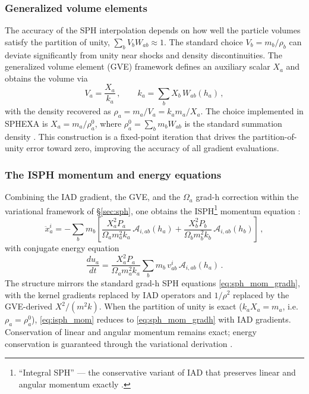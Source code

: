 \subsubsection*{Generalized volume elements}

The accuracy of the SPH interpolation depends on how well the particle volumes satisfy the partition of unity, $\sum_b V_b W_{ab} \approx 1$. The standard choice $V_b = m_b / \rho_b$ can deviate significantly from unity near shocks and density discontinuities. The generalized volume element (GVE) framework \cite{Cabezon2017, Cabezon2022} defines an auxiliary scalar $X_a$ and obtains the volume via
\begin{equation}
    V_a = \frac{X_a}{k_a}\,, \qquad k_a = \sum_b X_b \, W_{ab}(h_a)\,,
    \label{eq:gve}
\end{equation}
with the density recovered as $\rho_a = m_a / V_a = k_a m_a / X_a$. The choice implemented in SPHEXA is $X_a = m_a / \rho_a^0$, where $\rho_a^0 = \sum_b m_b W_{ab}$ is the standard summation density \cite{Cabezon2022}. This construction is a fixed-point iteration that drives the partition-of-unity error toward zero, improving the accuracy of all gradient evaluations.


\subsubsection*{The ISPH momentum and energy equations}

Combining the IAD gradient, the GVE, and the $\Omega_a$ grad-h correction within the variational framework of \S\ref{sec:sph}, one obtains the ISPH\footnote{``Integral SPH'' --- the conservative variant of IAD that preserves linear and angular momentum exactly \cite{Cabezon2022}.} momentum equation \cite{Cabezon2022}:
\begin{equation}
    \ddot{x}^i_a = -\sum_b m_b \left[\frac{X_a^2 P_a}{\Omega_a m_a^2 k_a} \, \mathcal{A}_{i,ab}(h_a) + \frac{X_b^2 P_b}{\Omega_b m_b^2 k_b} \, \mathcal{A}_{i,ab}(h_b) \right]\,,
    \label{eq:isph_mom}
\end{equation}
with conjugate energy equation
\begin{equation}
    \frac{du_a}{dt} = \frac{X_a^2 P_a}{\Omega_a m_a^2 k_a} \sum_b m_b \, v^i_{ab} \, \mathcal{A}_{i,ab}(h_a)\,.
    \label{eq:isph_energy}
\end{equation}
The structure mirrors the standard grad-h SPH equations \eqref{eq:sph_mom_gradh}, with the kernel gradients replaced by IAD operators and $1/\rho^2$ replaced by the GVE-derived $X^2/(m^2 k)$. When the partition of unity is exact ($k_a X_a = m_a$, i.e.\ $\rho_a = \rho_a^0$), \eqref{eq:isph_mom} reduces to \eqref{eq:sph_mom_gradh} with IAD gradients. Conservation of linear and angular momentum remains exact; energy conservation is guaranteed through the variational derivation \cite{Cabezon2022}.

